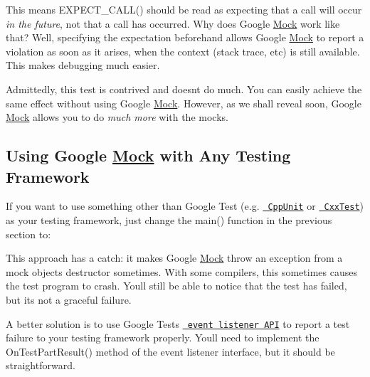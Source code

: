 This means {\ttfamily E\+X\+P\+E\+C\+T\+\_\+\+C\+A\+L\+L()} should be read as expecting that a call will occur {\itshape in the future}, not that a call has occurred. Why does Google \mbox{\hyperlink{class_mock}{Mock}} work like that? Well, specifying the expectation beforehand allows Google \mbox{\hyperlink{class_mock}{Mock}} to report a violation as soon as it arises, when the context (stack trace, etc) is still available. This makes debugging much easier.

Admittedly, this test is contrived and doesn\textquotesingle{}t do much. You can easily achieve the same effect without using Google \mbox{\hyperlink{class_mock}{Mock}}. However, as we shall reveal soon, Google \mbox{\hyperlink{class_mock}{Mock}} allows you to do {\itshape much more} with the mocks.

\subsection*{Using Google \mbox{\hyperlink{class_mock}{Mock}} with Any Testing Framework}

If you want to use something other than Google Test (e.\+g. \href{http://sourceforge.net/projects/cppunit/}\texttt{ Cpp\+Unit} or \href{http://cxxtest.tigris.org/}\texttt{ Cxx\+Test}) as your testing framework, just change the {\ttfamily main()} function in the previous section to\+: 
\begin{DoxyCode}{0}
\DoxyCodeLine{\}}
\end{DoxyCode}


This approach has a catch\+: it makes Google \mbox{\hyperlink{class_mock}{Mock}} throw an exception from a mock object\textquotesingle{}s destructor sometimes. With some compilers, this sometimes causes the test program to crash. You\textquotesingle{}ll still be able to notice that the test has failed, but it\textquotesingle{}s not a graceful failure.

A better solution is to use Google Test\textquotesingle{}s \href{../../googletest/docs/AdvancedGuide.md#extending-google-test-by-handling-test-events}\texttt{ event listener A\+PI} to report a test failure to your testing framework properly. You\textquotesingle{}ll need to implement the {\ttfamily On\+Test\+Part\+Result()} method of the event listener interface, but it should be straightforward.

